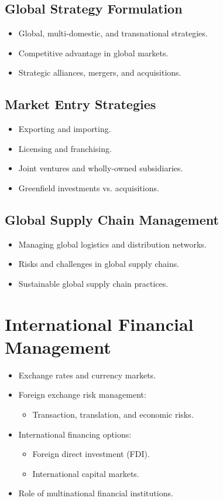 \subsection{Global Strategy Formulation}
\begin{itemize}
    \item Global, multi-domestic, and transnational strategies.
    \item Competitive advantage in global markets.
    \item Strategic alliances, mergers, and acquisitions.
\end{itemize}

\subsection{Market Entry Strategies}
\begin{itemize}
    \item Exporting and importing.
    \item Licensing and franchising.
    \item Joint ventures and wholly-owned subsidiaries.
    \item Greenfield investments vs. acquisitions.
\end{itemize}

\subsection{Global Supply Chain Management}
\begin{itemize}
    \item Managing global logistics and distribution networks.
    \item Risks and challenges in global supply chains.
    \item Sustainable global supply chain practices.
\end{itemize}

\section{International Financial Management}
\begin{itemize}
    \item Exchange rates and currency markets.
    \item Foreign exchange risk management:
    \begin{itemize}
        \item Transaction, translation, and economic risks.
    \end{itemize}
    \item International financing options:
    \begin{itemize}
        \item Foreign direct investment (FDI).
        \item International capital markets.
    \end{itemize}
    \item Role of multinational financial institutions.
\end{itemize}

